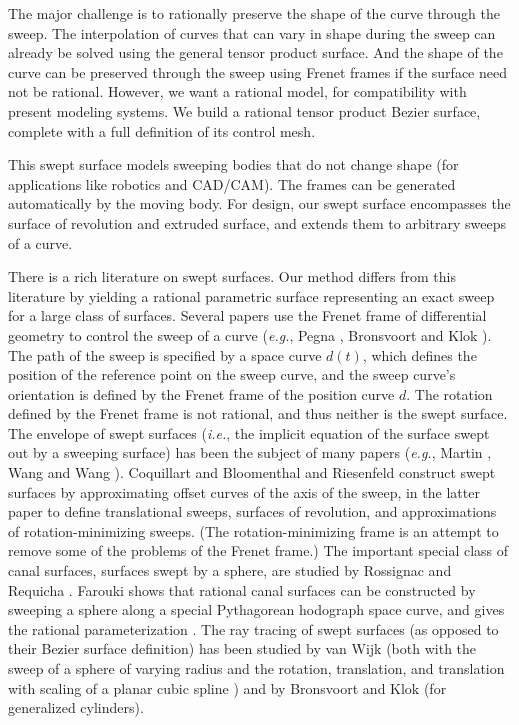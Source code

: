 The major challenge is to rationally preserve the shape of the curve 
through the sweep.
The interpolation of curves that can vary in shape during the sweep
can already be solved using the general tensor product surface.
And the shape of the curve can be preserved through the sweep
using Frenet frames if the surface need not be rational.
However, we want a rational model, for compatibility with 
present modeling systems.
We build a rational tensor product Bezier surface, complete with a full
definition of its control mesh.

This swept surface models sweeping bodies that do not change shape 
(for applications like robotics and CAD/CAM).
The frames can be generated automatically by the moving body.
For design, our swept surface encompasses the surface of revolution 
and extruded surface, and extends them to arbitrary sweeps of a curve.

There is a rich literature on swept surfaces.
Our method differs from this literature by yielding a rational parametric 
surface representing an exact sweep for a large class of surfaces.
Several papers use the Frenet frame of differential geometry
to control the sweep of a curve ({\em e.g.}, Pegna \cite{Pegna88},
Bronsvoort and Klok \cite{bronsklok85}).
The path of the sweep is specified by a space curve $d(t)$,
which defines the position of the reference point on the
sweep curve, and the sweep curve's orientation is defined by
the Frenet frame of the position curve $d$.
The rotation defined by the Frenet frame is not rational,
and thus neither is the swept surface.  %
The envelope of swept surfaces ({\em i.e.}, the implicit equation of the surface
swept out by a sweeping surface) has been the subject of many papers
({\em e.g.}, Martin \cite{martinsteph90}, Wang and Wang \cite{WangWang86}).
Coquillart \cite{coquillart87} and Bloomenthal and Riesenfeld 
\cite{bloom91} construct swept surfaces by approximating offset curves
of the axis of the sweep, in the latter paper to define translational sweeps,
surfaces of revolution, and approximations of rotation-minimizing 
sweeps.
(The rotation-minimizing frame 
is an attempt to remove some of the problems of the Frenet frame.)
The important special class of canal surfaces, 
surfaces swept by a sphere, are studied by Rossignac and Requicha 
\cite{rossrequicha84,rossignac85}.
Farouki shows that rational canal surfaces can be constructed by sweeping
a sphere along a special Pythagorean hodograph space curve, and gives the
rational parameterization \cite{farouki94}.
The ray tracing of swept surfaces (as opposed to their Bezier surface 
definition) has been studied by van Wijk (both with the sweep of a sphere
of varying radius \cite{vanwijk84euro} and the rotation, translation,
and translation with scaling of a planar cubic spline \cite{vanwijk84tog})
and by Bronsvoort and Klok \cite{bronsklok85} (for generalized cylinders).

